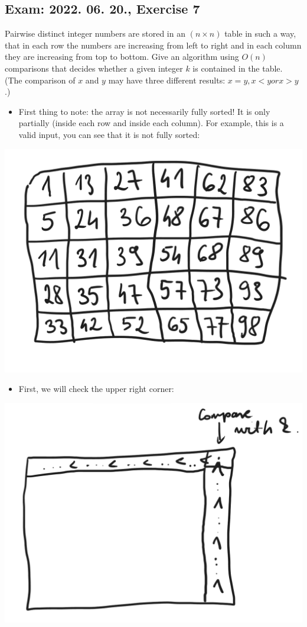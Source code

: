 \subsection{Exam: 2022. 06. 20., Exercise 7}


Pairwise distinct integer numbers are stored in an $(n \times n)$ table in such a way, that in each row the numbers are increasing from left to right and in each column they are increasing from top to bottom. Give an algorithm using $O(n)$ comparisons that decides whether a given integer $k$ is contained in the table. (The comparison of $x$ and $y$ may have three different results: $x = y, x < y or x > y$.)


\begin{itemize}
    \item First thing to note: the array is not necessarily fully sorted! It is only partially (inside each row and inside each column). For example, this is a valid input, you can see that it is not fully sorted:
\end{itemize}

\begin{center}
\includegraphics[width=0.5\linewidth]{exams/2022_06_20/07/example_table.png}
\end{center}

\begin{itemize}
\item First, we will check the upper right corner:
\end{itemize}

\begin{center}
\includegraphics[width=0.7\linewidth]{exams/2022_06_20/07/comparison.png}
\end{center}

